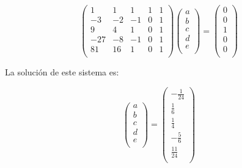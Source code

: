 \documentclass{article}
\begin{document}
\begin{enumerate}[1)]
{        \[ \left( 
            \begin{array}{rrrrr} 
                1 &  1 &  1 & 1 & 1 \\
               -3 & -2 & -1 & 0 & 1 \\
                9 &  4 &  1 & 0 & 1 \\
              -27 & -8 & -1 & 0 & 1 \\
               81 & 16 &  1 & 0 & 1 \\
            \end{array}
           \right)
           \left(
            \begin{array}{c}
                a \\
                b \\
                c \\
                d \\
                e \\
            \end{array}
           \right)
           =
           \left(
            \begin{array}{c}
                0 \\
                0 \\
                1 \\
                0 \\
                0 \\
            \end{array}
           \right)
        \]

        La solución de este sistema es:

        \[
           \left(
            \begin{array}{c}
                a \\
                b \\
                c \\
                d \\
                e \\
            \end{array}
           \right)
           =
           \left(
            \begin{array}{c}
                -\frac{1}{24} \\
                 \frac{1}{6} \\
                 \frac{1}{4} \\
                -\frac{5}{6} \\
                 \frac{11}{24} \\
            \end{array}
           \right)
        \]

}
\end{enumerate}
\end{document}

